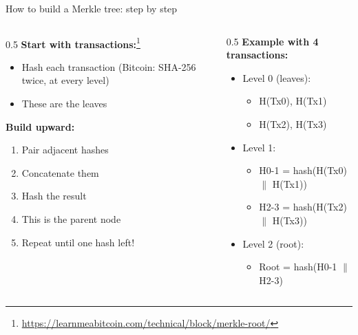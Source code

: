 \ifdefined\PRESENTATION\else\PassOptionsToClass{handout}{beamer}\fi\documentclass[aspectratio=169, lualatex]{beamer}
\begin{document}
\begin{frame}{How to build a Merkle tree: step by step}
	\begin{columns}[c]
		\begin{column}{0.5\textwidth}
			\textbf{Start with transactions:}\footnote{\url{https://learnmeabitcoin.com/technical/block/merkle-root/}}
			\begin{itemize}
				\item Hash each transaction (Bitcoin: SHA-256 twice, at every level)
				\item These are the leaves
			\end{itemize}
			\textbf{Build upward:}
			\begin{enumerate}
				\item Pair adjacent hashes
				\item Concatenate them
				\item Hash the result
				\item This is the parent node
				\item Repeat until one hash left!
			\end{enumerate}
		\end{column}
		\begin{column}{0.5\textwidth}
			\textbf{Example with 4 transactions:}
			\begin{itemize}
				\item Level 0 (leaves):
				      \begin{itemize}
					      \item H(Tx0), H(Tx1)
					      \item H(Tx2), H(Tx3)
				      \end{itemize}
				\item Level 1:
				      \begin{itemize}
					      \item H0-1 = hash(H(Tx0) $\|$ H(Tx1))
					      \item H2-3 = hash(H(Tx2) $\|$ H(Tx3))
				      \end{itemize}
				\item Level 2 (root):
				      \begin{itemize}
					      \item Root = hash(H0-1 $\|$ H2-3)
				      \end{itemize}
			\end{itemize}
		\end{column}
	\end{columns}
\end{frame}
\end{document}
